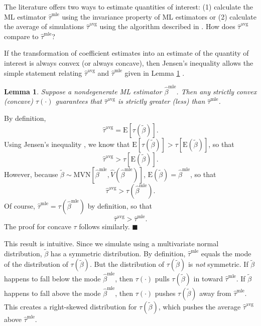 \documentclass[11pt]{article}
\newtheorem{lemma}{Lemma}
\newenvironment{proof}[1][Proof]{\begin{trivlist}
\item[\hskip \labelsep {\bfseries #1}]}{\end{trivlist}}
\begin{document}
The literature offers two ways to estimate quantities of interest: (1) calculate the ML estimator $\hat{\tau}^\text{mle}$ using the invariance property of ML estimators or (2) calculate the average of simulations $\hat{\tau}^\text{avg}$ using the algorithm described in \cite{KingTomzWittenberg2000}. How does $\hat{\tau}^\text{avg}$ compare to $\hat{\tau}^{\text{mle}}$?

If the transformation of coefficient estimates into an estimate of the quantity of interest is always convex (or always concave), then Jensen's inequality allows the simple statement relating $\hat{\tau}^\text{avg}$ and $\hat{\tau}^{\text{mle}}$ given in Lemma \ref{lem:direction} .

\begin{lemma}\label{lem:direction}
Suppose a nondegenerate ML estimator $\hat{\beta}^\text{mle}$.
Then any strictly convex (concave) $\tau(\cdot)$ guarantees that $\hat{\tau}^{\text{avg}}$ is strictly greater (less) than $\hat{\tau}^\text{mle}$.
\end{lemma}
\begin{proof}
By definition, $$ \hat{\tau}^{\text{avg}} = \text{E}\left[ \tau \left(\tilde{\beta} \right) \right].$$
Using Jensen's inequality \citep[p.\@ 190, Thm.\@ 4.7.7]{CasellaBerger2002}, we know that $\text{E}\left[ \tau \left(\tilde{\beta} \right) \right] > \tau \left[ \text{E}\left( \tilde{\beta} \right) \right]$, so that $$\hat{\tau}^{\text{avg}} > \tau \left[ \text{E}\left( \tilde{\beta} \right) \right].$$
However, because $\tilde{\beta} \sim \text{MVN} \left[ \hat{\beta}^{\text{mle}}, \hat{V} \left( \hat{\beta}^{\text{mle}} \right) \right]$, $\text{E}\left( \tilde{\beta} \right) = \hat{\beta}^\text{mle}$, so that
$$\hat{\tau}^{\text{avg}} > \tau \left( \hat{\beta}^\text{mle}\right).$$
Of course, $\hat{\tau}^\text{mle} = \tau \left( {\hat{\beta}^\text{mle}} \right)$ by definition, so that $$\hat{\tau}^{\text{avg}} > \hat{\tau}^\text{mle}.$$
The proof for concave $\tau$ follows similarly.
 $\blacksquare$
\end{proof}

\noindent This result is intuitive. Since we simulate using a multivariate normal distribution, $\tilde{\beta}$ has a symmetric distribution. By definition, $\hat{\tau}^\text{mle}$ equals the mode of the distribution of $\tau(\tilde{\beta})$. But the distribution of $\tau(\tilde{\beta})$ is \emph{not} symmetric. If $\tilde{\beta}$ happens to fall below the mode $\hat{\beta}^\text{mle}$, then $\tau(\cdot)$ pulls $\tau(\tilde{\beta})$ in toward $\hat{\tau}^\text{mle}$.
If $\tilde{\beta}$ happens to fall above the mode $\hat{\beta}^\text{mle}$, then $\tau(\cdot)$ pushes $\tau(\tilde{\beta})$ away from $\hat{\tau}^\text{mle}$. This creates a right-skewed distribution for $\tau(\tilde{\beta})$, which pushes the average $\hat{\tau}^\text{avg}$ above $\hat{\tau}^\text{mle}$.
\end{document}
